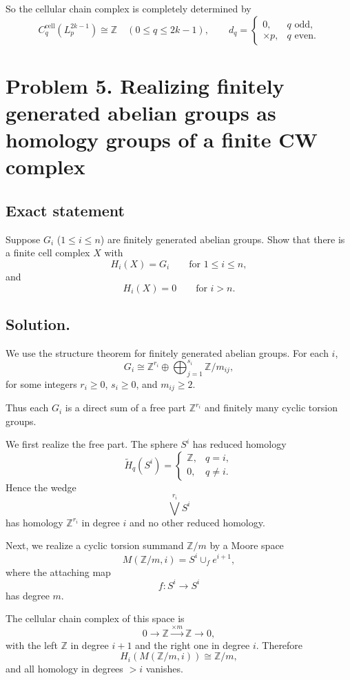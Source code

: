\documentclass[12pt,a4paper]{article}
\theoremstyle{notespace}
\begin{document}
So the cellular chain complex is completely determined by
\[
C_q^{\mathrm{cell}}(L_p^{2k-1})\cong \mathbb Z \quad (0\le q\le 2k-1),
\qquad
d_q=
\begin{cases}
	0, & q\text{ odd},\\
	\times p, & q\text{ even}.
\end{cases}
\]

\bigskip

\section{Problem 5. Realizing finitely generated abelian groups as homology groups of a finite CW complex}

\subsection*{Exact statement}
Suppose \(G_i\) (\(1\le i\le n\)) are finitely generated abelian groups. Show that there is a finite cell complex \(X\) with
\[
H_i(X)=G_i \qquad \text{for } 1\le i\le n,
\]
and
\[
H_i(X)=0 \qquad \text{for } i>n.
\]

\subsection*{Solution.}
We use the structure theorem for finitely generated abelian groups. For each \(i\),
\[
G_i \cong \mathbb Z^{r_i}\oplus \bigoplus_{j=1}^{s_i}\mathbb Z/m_{ij},
\]
for some integers \(r_i\ge 0\), \(s_i\ge 0\), and \(m_{ij}\ge 2\).

Thus each \(G_i\) is a direct sum of a free part \(\mathbb Z^{r_i}\) and finitely many cyclic torsion groups.

\medskip
\noindent
We first realize the free part. The sphere \(S^i\) has reduced homology
\[
\widetilde H_q(S^i)=
\begin{cases}
	\mathbb Z, & q=i,\\
	0, & q\ne i.
\end{cases}
\]
Hence the wedge
\[
\bigvee^{r_i} S^i
\]
has homology \(\mathbb Z^{r_i}\) in degree \(i\) and no other reduced homology.

\medskip
\noindent
Next, we realize a cyclic torsion summand \(\mathbb Z/m\) by a Moore space
\[
M(\mathbb Z/m,i)=S^i\cup_f e^{i+1},
\]
where the attaching map
\[
f:S^i\to S^i
\]
has degree \(m\).

The cellular chain complex of this space is
\[
0\to \mathbb Z \xrightarrow{\times m} \mathbb Z \to 0,
\]
with the left \(\mathbb Z\) in degree \(i+1\) and the right one in degree \(i\). Therefore
\[
H_i(M(\mathbb Z/m,i))\cong \mathbb Z/m,
\]
and all homology in degrees \(>i\) vanishes.
\end{document}
